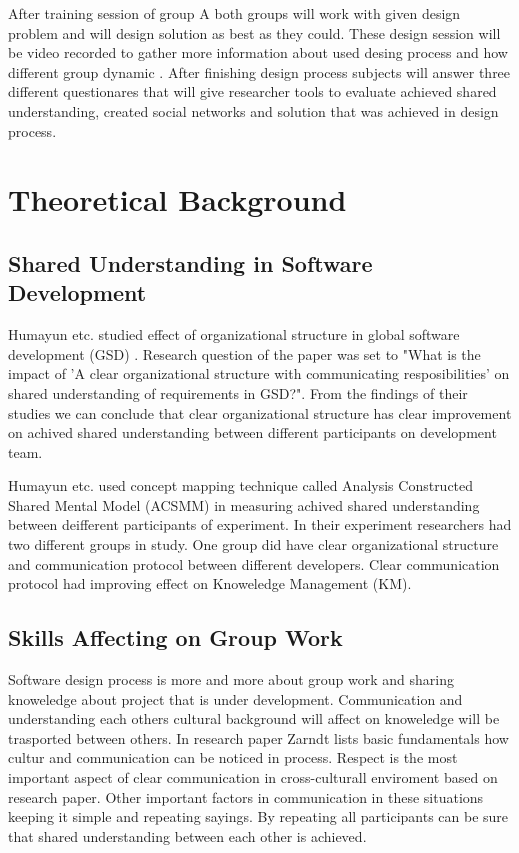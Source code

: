 \documentclass[english]{tktltiki2}
\theoremstyle{definition}
\theoremstyle{remark}
\begin{document}
After training session of group A both groups will work with given design problem and will design solution as best as they could. These design session will be video recorded to gather more information about used desing process and how different group dynamic . After finishing design process subjects will answer three different questionares that will give researcher tools to evaluate achieved shared understanding, created social networks and solution that was achieved in design process.


\section{Theoretical Background}

\subsection{Shared Understanding in Software Development}

Humayun etc. studied effect of organizational structure in global software development (GSD) \cite{organizationalStructure}. Research question of the paper was set to "What is the impact of 'A clear organizational structure with communicating resposibilities' on shared understanding of requirements in GSD?". From the findings of their studies we can conclude that clear organizational structure has clear improvement on achived shared understanding between different participants on development team.

Humayun etc. used concept mapping technique called Analysis Constructed Shared Mental Model (ACSMM) in measuring achived shared understanding between deifferent participants of experiment. In their experiment researchers had two different groups in study. One group did have clear organizational structure and communication protocol between different developers. Clear communication protocol had improving effect on Knoweledge Management (KM)\cite{organizationalStructure}.

\subsection{Skills Affecting on Group Work}

Software design process is more and more about group work and sharing knoweledge about project that is under development. Communication and understanding each others cultural background will affect on knoweledge will be trasported between others. In research paper Zarndt lists basic fundamentals how cultur and communication can be noticed in process\cite{culturalCommunication}. Respect is the most important aspect of clear communication in cross-culturall enviroment based on research paper. Other important factors in communication in these situations keeping it simple and repeating sayings. By repeating all participants can be sure that shared understanding between each other is achieved\cite{culturalCommunication}.
\end{document}
